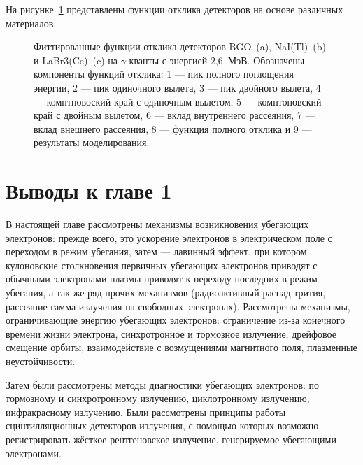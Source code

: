 На рисунке~\ref{fig:scintillatorResponseExample} представлены функции отклика детекторов на основе различных материалов. 

\begin{figure}[ht]
  \caption{ Фиттированные функции отклика детекторов BGO~(a), NaI(Tl)~(b) и LaBr3(Ce)~(c) на $\gamma$-кванты с энергией 2,6~МэВ. Обозначены компоненты функций отклика: 1 --- пик полного поглощения энергии, 2 --- пик одиночного вылета, 3 --- пик двойного вылета, 4 --- комптновоский край с одиночным вылетом, 5 — комптоновский край с двойным вылетом, 6 --- вклад внутреннего рассеяния, 7 --- вклад внешнего рассеяния, 8 --- функция полного отклика и 9 --- результаты моделирования.~\cite{Grozdanov2021}}
  \label{fig:scintillatorResponseExample}
\end{figure}


\FloatBarrier
\section{Выводы к главе 1}

В настоящей главе рассмотрены механизмы возникновения убегающих электронов: прежде всего, это ускорение электронов в электрическом поле с переходом в режим убегания, затем --- лавинный эффект, при котором кулоновские столкновения первичных убегающих электронов приводят с обычными электронами плазмы приводят к переходу последних в режим убегания, а так же ряд прочих механизмов (радиоактивный распад трития, рассеяние гамма излучения на свободных электронах). Рассмотрены механизмы, ограничивающие энергию убегающих электронов: ограничение из-за конечного времени жизни электрона, синхротронное и тормозное излучение, дрейфовое смещение орбиты, взаимодействие с возмущениями магнитного поля, плазменные неустойчивости.

Затем были рассмотрены методы диагностики убегающих электронов: по тормозному и синхротронному излучению, циклотронному излучению, инфракрасному излучению. Были рассмотрены принципы работы сцинтилляционных детекторов излучения, с помощью которых возможно регистрировать жёсткое рентгеновское излучение, генерируемое убегающими электронами.


\FloatBarrier
